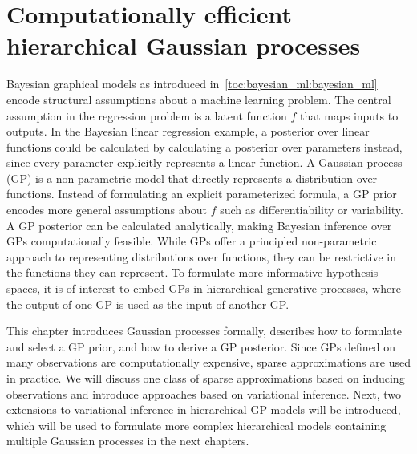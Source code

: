 \chapter{Computationally efficient hierarchical Gaussian processes}
\label{toc:gp}
Bayesian graphical models as introduced in~\cref{toc:bayesian_ml:bayesian_ml} encode structural assumptions about a machine learning problem.
The central assumption in the regression problem is a latent function $f$ that maps inputs to outputs.
In the Bayesian linear regression example, a posterior over linear functions could be calculated by calculating a posterior over parameters instead, since every parameter explicitly represents a linear function.
A Gaussian process (GP) is a non-parametric model that directly represents a distribution over functions.
Instead of formulating an explicit parameterized formula, a GP prior encodes more general assumptions about $f$ such as differentiability or variability.
A GP posterior can be calculated analytically, making Bayesian inference over GPs computationally feasible.
While GPs offer a principled non-parametric approach to representing distributions over functions, they can be restrictive in the functions they can represent.
To formulate more informative hypothesis spaces, it is of interest to embed GPs in hierarchical generative processes, where the output of one GP is used as the input of another GP.

This chapter introduces Gaussian processes formally, describes how to formulate and select a GP prior, and how to derive a GP posterior.
Since GPs defined on many observations are computationally expensive, sparse approximations are used in practice.
We will discuss one class of sparse approximations based on inducing observations and introduce approaches based on variational inference.
Next, two extensions to variational inference in hierarchical GP models will be introduced, which will be used to formulate more complex hierarchical models containing multiple Gaussian processes in the next chapters.


